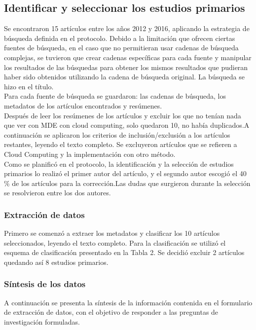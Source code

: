 \documentclass{llncs}
\begin{document}
\subsection{Identificar y seleccionar los estudios primarios}
Se encontraron 15 artículos entre los años 2012 y 2016, aplicando la estrategia de búsqueda definida en el protocolo. Debido a la limitación que ofrecen ciertas fuentes de búsqueda, en el caso que no permitieran usar cadenas de búsqueda complejas, se tuvieron que crear cadenas específicas para cada fuente y manipular los resultados de las búsquedas para obtener los mismos resultados que pudieran haber sido obtenidos utilizando la cadena de búsqueda original. La búsqueda se hizo en el título.\\
Para cada fuente de búsqueda se guardaron: las cadenas de búsqueda, los metadatos de los artículos encontrados y resúmenes.\\
Después de leer los resúmenes de los artículos y excluir los que no tenían nada que ver con MDE con cloud computing, solo quedaron 10, no había duplicados.A continuación se aplicaron los criterios de inclusión/exclusión a los artículos restantes, leyendo el texto completo. Se excluyeron artículos que se refieren a Cloud Computing y la implementación con otro método.\\
Como se planificó en el protocolo, la identificación y la selección de estudios primarios lo realizó el primer autor del artículo, y el segundo autor escogió el 40 \% de los artículos para la corrección.Las dudas que surgieron durante la selección se resolvieron entre los dos autores.
\clearpage

\subsubsection{Extracción de datos}
Primero se comenzó a extraer los metadatos y clasificar los 10 artículos seleccionados, leyendo el texto completo. Para la clasificación se utilizó el esquema de clasificación presentado en la Tabla 2. Se decidió excluir 2 artículos quedando así 8 estudios primarios.

\subsubsection{Síntesis de los datos}
A continuación se presenta la síntesis de la información contenida en el formulario de extracción de datos, con el objetivo de responder a las preguntas de investigación formuladas.
\end{document}
